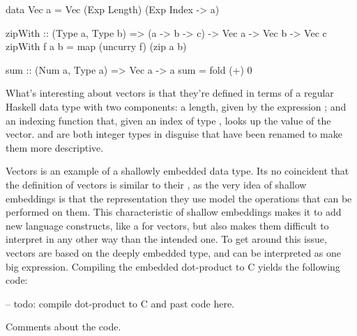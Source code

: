 \documentclass[../main.tex]{subfiles}
\begin{document}
\begin{code}
data Vec a = Vec (Exp Length) (Exp Index -> a)

zipWith :: (Type a, Type b) => (a -> b -> c) -> Vec a -> Vec b -> Vec c
zipWith f a b = map (uncurry f) (zip a b)

sum :: (Num a, Type a) => Vec a -> a
sum = fold (+) 0
\end{code}

\noindent What's interesting about vectors is that they're defined in terms of a regular Haskell data type with two components: a length, given by the expression ; and an indexing function  that, given an index of type , looks up the value  of the vector.  and  are both integer types in disguise that have been renamed to make them more descriptive.

Vectors is an example of a shallowly embedded data type. Its no coincident that the definition of vectors is similar to their , as the very idea of shallow embeddings is that the representation they use model the operations that can be performed on them. This characteristic of shallow embeddings makes it  to add new language constructs, like a  for vectors, but also makes them difficult to interpret in any other way than the intended one. To get around this issue, vectors are based on the deeply embedded  type, and can be interpreted as one big expression. Compiling the embedded dot-product to C yields the following code:

\begin{code}
-- todo: compile dot-product to C and past code here.
\end{code}

Comments about the code.
\end{document}
